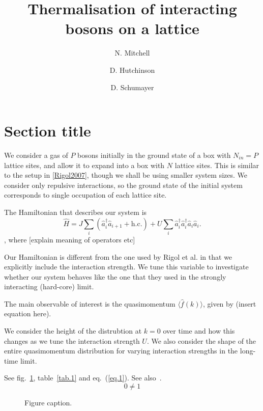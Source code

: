 \documentclass[doublecol]{epl2}
\title{Thermalisation of interacting bosons on a lattice}
\author{N. Mitchell\inst{1} \and 
D. Hutchinson\inst{1} \and 
D. Schumayer\inst{1}}
\institute{                    
  \inst{1} University of Otago - Address\\
  
}
\begin{document}
\maketitle


\section{Section title}
We consider a gas of $P$ bosons initially in the ground state of a box with 
$N_{in}=P$ lattice sites, and allow it to expand into a box with $N$ lattice sites.
This is similar to the setup in \ref{Rigol2007}, though we shall be using 
smaller system sizes.
We consider only repulsive interactions, so the ground state of the initial 
system corresponds to single occupation of each lattice site. 


The Hamiltonian that describes our system is 
\begin{equation*}
    \hat{H}
    =
    J \sum_{i}{(\hat{a}^\dagger_{i}\hat{a}_{i+1} + \text{h.c.})} +
    U\sum_{i}{\hat{a}^\dagger_{i} \hat{a}^\dagger_{i} \hat{a}_{i}\hat{a}_{i}}.
\end{equation*},
where [explain meaning of operators etc]

Our Hamiltonian is different from the one used by Rigol et al. in that we 
explicitly include the interaction strength. We tune this variable to 
investigate whether our system behaves like the one that they used
in the strongly interacting (hard-core) limit.

The main observable of interest is the quasimomentum $\langle\hat{f}(k)\rangle$,
given by (insert equation here).

We consider the height of the distrubtion at $k=0$ over time and how this 
changes as we tune the interaction strength $U$. We also consider the shape of
the entire quasimomentum distribution for varying interaction strengths in 
the long-time limit.



See fig.~\ref{fig.1}, table~\ref{tab.1} and eq.~(\ref{eq.1}).
See also~\cite{b.a,b.b}.
\begin{equation}
\label{eq.1}
0\neq1
\end{equation}


\begin{figure}
\caption{Figure caption.}
\label{fig.1}
\end{figure}
\end{document}

